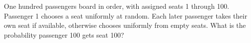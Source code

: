 One hundred passengers board in order, with assigned seats 1 through 100. Passenger 1 chooses a seat uniformly at random. Each later passenger takes their own seat if available, otherwise chooses uniformly from empty seats. What is the probability passenger 100 gets seat 100?
